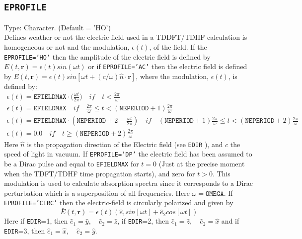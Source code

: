 \documentclass[a4paper,twoside,openany]{book}
\begin{document}
 \subsection{\texttt{EPROFILE}}
 Type: Character. (Default = 'HO')\\
 Defines weather or not the electric field used in a TDDFT/TDHF calculation is homogeneous or not and the modulation, $\epsilon(t)$, of the field. If  the \texttt{EPROFILE='HO'} then the amplitude of the electric field is defined by
 $E(t, \mathbf{r}) = \epsilon(t)sin(\omega t)$ or if  \texttt{EPROFILE='AC'} then the electric field is defined by  $E(t,\mathbf{r}) = \epsilon(t)sin[\omega t + (c/\omega)\hat{n}\cdot\mathbf{r}]$, where the modulation, $\epsilon(t)$, is defined by:
 \begin{eqnarray}
 \epsilon(t) =  \texttt{EFIELDMAX}\cdot\Big (\frac{\omega t}{2\pi}\Big ) \quad if \quad t < \frac{2\pi}{\omega} \nonumber \qquad \qquad \qquad  \qquad  \qquad  \qquad   \qquad  \qquad \qquad  \qquad   \qquad   \quad \\
 \epsilon(t) = \texttt{EFIELDMAX}  \quad if \quad  \frac{2\pi}{\omega} \nonumber \le t <  (\texttt{NEPERIOD} + 1 )\frac{2\pi}{\omega}   \qquad  \qquad  \qquad  \qquad  \qquad \qquad  \qquad  \qquad \quad \nonumber \\
 \epsilon(t) = \texttt{EFIELDMAX}\cdot( \texttt{NEPERIOD} + 2 - \frac{\omega t}{2\pi}  ) \quad if \quad   (\texttt{NEPERIOD} + 1 )\frac{2\pi}{\omega}  \le t <  (\texttt{NEPERIOD} + 2 )\frac{2\pi}{\omega} \nonumber \\
  \epsilon(t) = 0.0  \quad if \quad t \ge  (\texttt{NEPERIOD} + 2 )\frac{2\pi}{\omega}  \qquad  \qquad  \qquad  \qquad  \qquad  \qquad  \qquad \qquad  \qquad  \qquad   \qquad  \quad \nonumber 
  \end{eqnarray}
 Here $\hat{n}$ is the propagation direction of the Electric field (see \texttt{EDIR} ), and $c$ the speed of light in vacuum. If \texttt{EPROFILE='DP'} the electric field has been assumed to be a Dirac pulse  and equal to 
 \texttt{EFIELDMAX} for $t=0$ (Just at the precise moment when the TDFT/TDHF time propagation starts), and zero for $t> 0$. This modulation is used to calculate absorption spectra since it corresponds to a Dirac perturbation which is a superposition 
 of all frequencies. Here $\omega = \texttt{OMEGA}$. If \texttt{EPROFILE='CIRC'} then the electric-field is circularly polarized and given by 
\begin{equation}
\bar{E}(t,\mathbf{r}) =  \epsilon(t)( \hat{e}_{1}sin[\omega t] + \hat{e}_{2}cos[\omega t] )
\end{equation}
Here if \texttt{EDIR}=1, then $\hat{e}_{1} = \hat{y},\quad \hat{e}_{2} = \hat{z}$,  if \texttt{EDIR}=2, then $\hat{e}_{1} = \hat{z},\quad \hat{e}_{2} = \hat{x}$ and if \texttt{EDIR}=3, then $\hat{e}_{1} = \hat{x},\quad \hat{e}_{2} = \hat{y}$.
 
\end{document}
